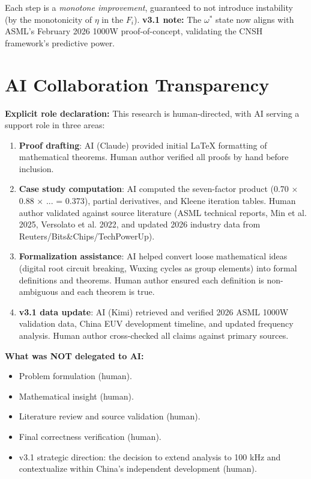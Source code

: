 \documentclass[twocolumn]{article}
\begin{document}
Each step is a \emph{monotone improvement}, guaranteed to not introduce instability (by the monotonicity of $\eta$ in the $F_i$). \textbf{v3.1 note:} The $\omega^*$ state now aligns with ASML's February 2026 1000W proof-of-concept, validating the CNSH framework's predictive power.

\section{AI Collaboration Transparency}

\textbf{Explicit role declaration:} This research is human-directed, with AI serving a support role in three areas:

\begin{enumerate}
  \item \textbf{Proof drafting}: AI (Claude) provided initial LaTeX formatting of mathematical theorems. Human author verified all proofs by hand before inclusion.
  \item \textbf{Case study computation}: AI computed the seven-factor product (0.70 × 0.88 × ... = 0.373), partial derivatives, and Kleene iteration tables. Human author validated against source literature (ASML technical reports, Min et al. 2025, Versolato et al. 2022, and updated 2026 industry data from Reuters/Bits\&Chips/TechPowerUp).
  \item \textbf{Formalization assistance}: AI helped convert loose mathematical ideas (digital root circuit breaking, Wuxing cycles as group elements) into formal definitions and theorems. Human author ensured each definition is non-ambiguous and each theorem is true.
  \item \textbf{v3.1 data update}: AI (Kimi) retrieved and verified 2026 ASML 1000W validation data, China EUV development timeline, and updated frequency analysis. Human author cross-checked all claims against primary sources.
\end{enumerate}

\textbf{What was NOT delegated to AI:}
\begin{itemize}
  \item Problem formulation (human).
  \item Mathematical insight (human).
  \item Literature review and source validation (human).
  \item Final correctness verification (human).
  \item v3.1 strategic direction: the decision to extend analysis to 100 kHz and contextualize within China's independent development (human).
\end{itemize}
\end{document}
